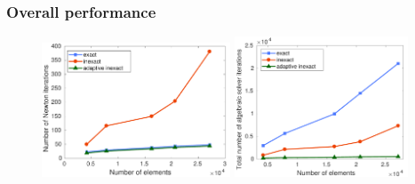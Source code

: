 \begin{frame}
\frametitle{Overall performance}
\begin{figure}
\includegraphics[width=0.5\textwidth]{p2/P2_number_Newton_iter_per_elements}  
\quad  
 \includegraphics[width=0.46\textwidth]{p2/P2_tot_number_GMRES_iter_per_elements}
\end{figure}
\end{frame}
